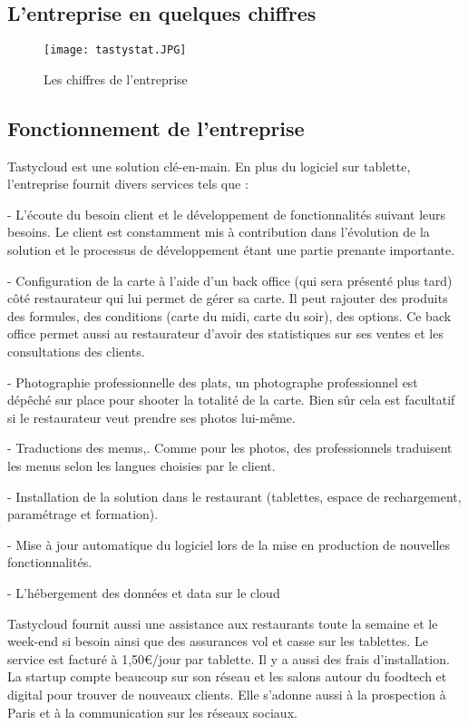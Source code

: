 \subsection{L'entreprise en quelques chiffres}

\begin{figure}[!htb]
  \centering
  \texttt{[image: tastystat.JPG]}
  \caption{Les chiffres de l'entreprise}
  \label{fig:boat1}
\end{figure}

\subsection{Fonctionnement de l'entreprise}

Tastycloud est une solution clé-en-main. En plus du logiciel sur tablette, l'entreprise fournit divers services tels que :

- L'écoute du besoin client et le développement de fonctionnalités suivant leurs besoins. Le client est constamment mis à contribution dans l'évolution de la solution et le processus de développement étant une partie prenante importante.

- Configuration de la carte à l'aide d'un back office (qui sera présenté plus tard) côté restaurateur qui lui permet de gérer sa carte. Il peut rajouter des produits des formules, des conditions (carte du midi, carte du soir), des options. Ce back office permet aussi au restaurateur d'avoir des statistiques sur ses ventes et les consultations des clients.

- Photographie professionnelle des plats, un photographe professionnel est dépêché sur place pour shooter la totalité de la carte. Bien sûr cela est facultatif si le restaurateur veut prendre ses photos lui-même.

- Traductions des menus,. Comme pour les photos, des professionnels traduisent les menus selon les langues choisies par le client.

- Installation de la solution dans le restaurant (tablettes, espace de rechargement, paramétrage et formation).

- Mise à jour automatique du logiciel lors de la mise en production de nouvelles fonctionnalités.

- L'hébergement des données et data sur le cloud

Tastycloud fournit aussi une assistance aux restaurants toute la semaine et le week-end si besoin ainsi que des assurances vol et casse sur les tablettes. Le service est facturé à 1,50\euro/jour par tablette. Il y a aussi des frais d'installation.
La startup compte beaucoup sur son réseau et les salons autour du foodtech et digital pour trouver de nouveaux clients. Elle s'adonne aussi à la prospection à Paris et à la communication sur les réseaux sociaux.

